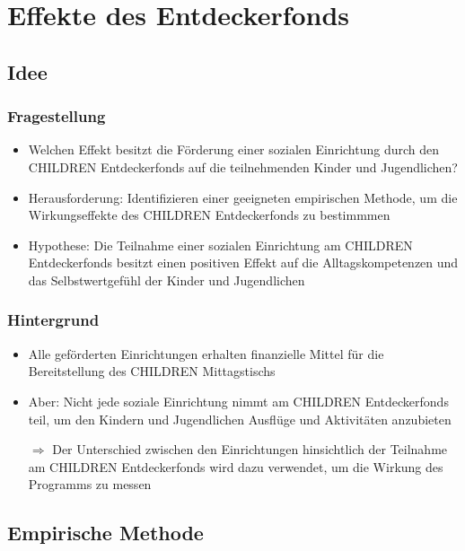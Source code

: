 \begin{frame}[fragile]
\begin{frame}[fragile]
\begin{frame}
\end{frame}


\section{Effekte des Entdeckerfonds}

\subsection{Idee}

\begin{frame}[fragile]
\frametitle{Fragestellung}
\begin{itemize}
\item Welchen Effekt besitzt die Förderung einer sozialen Einrichtung durch den CHILDREN Entdeckerfonds auf die teilnehmenden Kinder und Jugendlichen?
\item Herausforderung: Identifizieren einer geeigneten empirischen Methode, um die Wirkungseffekte des CHILDREN Entdeckerfonds zu bestimmmen
\linebreak
\item Hypothese: Die Teilnahme einer sozialen Einrichtung am CHILDREN Entdeckerfonds besitzt einen positiven Effekt auf die Alltagskompetenzen und das Selbstwertgefühl der Kinder und Jugendlichen
\end{itemize}
\end{frame}


\begin{frame}[fragile]
\frametitle{Hintergrund}
\begin{itemize}
\item Alle geförderten Einrichtungen erhalten finanzielle Mittel für die Bereitstellung des CHILDREN Mittagstischs
\item Aber: Nicht jede soziale Einrichtung nimmt am CHILDREN Entdeckerfonds teil, um den Kindern und Jugendlichen Ausflüge und Aktivitäten anzubieten
\linebreak
\item [$\Rightarrow$] Der Unterschied zwischen den Einrichtungen hinsichtlich der Teilnahme am CHILDREN Entdeckerfonds wird dazu verwendet, um die Wirkung des Programms zu messen
\end{itemize}
\end{frame}

\subsection{Empirische Methode}


\end{frame}
\end{frame}
